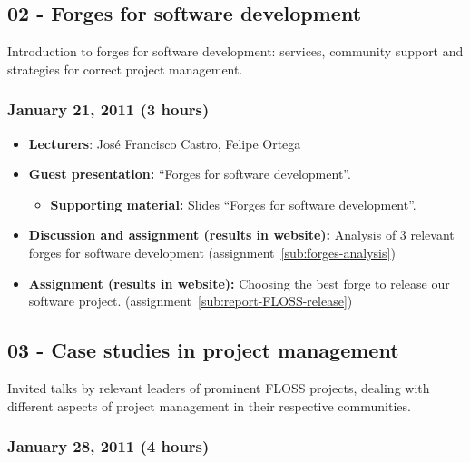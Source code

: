 \documentclass[a4paper]{article}
\begin{document}
\subsection{02 - Forges for software development}

Introduction to forges for software development: services, community support and strategies for correct project management.

\subsubsection{January 21, 2011 (3 hours)}

\begin{itemize}
\item \textbf{Lecturers}: José Francisco Castro, Felipe Ortega
\item \textbf{Guest presentation:} ``Forges for software development''.
  \begin{itemize}
  \item \textbf{Supporting material:} Slides ``Forges for software development''.
  \end{itemize}
\item \textbf{Discussion and assignment (results in website):} Analysis of 3 relevant forges for software development (assignment~\ref{sub:forges-analysis})
\item \textbf{Assignment (results in website):} Choosing the best forge to release our software project. (assignment~\ref{sub:report-FLOSS-release})
\end{itemize}

\subsection{03 - Case studies in project management}

Invited talks by relevant leaders of prominent FLOSS projects, dealing with different aspects of project management in their respective communities.

\subsubsection{January 28, 2011 (4 hours)}
\end{document}
